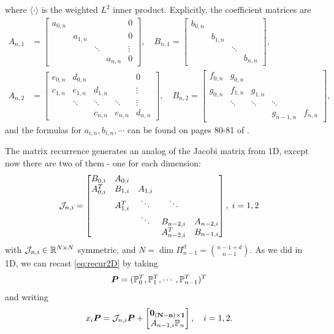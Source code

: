 where $\langle \cdot \rangle$ is the weighted $L^2$ inner product. Explicitly, the coefficient matrices are 
\begin{align}\label{eq:koornmatrec}
	A_{n,1} &= 
	\begin{bmatrix}
		a_{0,n} & & & & 0\\
		& a_{1,n} & & & 0\\
		& & \ddots & & \vdots \\
		& & & a_{n,n} & 0	
	\end{bmatrix}, \quad 
	B_{n,1} = 
	\begin{bmatrix}
		b_{0,n} & & &\\
		& b_{1,n} & &\\
		& & \ddots & \\
		& & & b_{n,n}	
	\end{bmatrix},\\
	A_{n,2} &= 
	\begin{bmatrix}
		e_{0,n} & d_{0,n}& & & 0\\
		c_{1,n} & e_{1,n} & d_{1,n}& & \vdots \\
		& \ddots & \ddots & \ddots & \vdots \\
		& & c_{n,n} & e_{n,n} & d_{n,n}
	\end{bmatrix},\quad 
	B_{n,2} = 
	\begin{bmatrix}
		f_{0,n} & g_{0,n}& & \\
		g_{0,n} & f_{1,n} & g_{1,n}&  \\
		& \ddots & \ddots & \ddots \\
		& &  & g_{n-1,n} & f_{n,n}
	\end{bmatrix},
\end{align}
and the formulas for $a_{i,n},b_{i,n},\cdots$ can be found on pages 80-81 of \cite{dunkl_xu}. 

The matrix recurrence generates an analog of the Jacobi matrix from 1D, except now there are two of them - one for each dimension:
\begin{equation}\label{eq:jacmat2d}
	\mathcal{J}_{n,i} = 
	\begin{bmatrix}
	B_{0,i} & A_{0,i} & & &\\
	A_{0,i}^T & B_{1,i} & A_{1,i} & & \\
	& A_{1,i}^T & \ddots & \ddots & \\
	& & \ddots & B_{n-2,i} & A_{n-2,i}\\
	& & & A_{n-2,i}^T & B_{n-1,i}	
	\end{bmatrix},\; i=1,2
\end{equation}
with $\mathcal{J}_{n,i} \in \mathbb{R}^{N\times N}$ symmetric, and $N = \dim\Pi_{n-1}^d = {n-1+d\choose n-1}$. As we did in 1D, we can recast \eqref{eq:recur2D} by taking $$\boldsymbol{P} = (\mathbb{P}_0^T,\mathbb{P}_1^T,\cdots,\mathbb{P}_{n-1}^T)^T$$ and writing 
\begin{equation}\label{eq:jni}
	x_i\boldsymbol{P} = \mathcal{J}_{n,i}\boldsymbol{P}+ \begin{bmatrix} \bf{0}_{(N-n) \times 1} \\ A_{n-1,i}\mathbb{P}_n\end{bmatrix},\quad i=1,2.
\end{equation}


